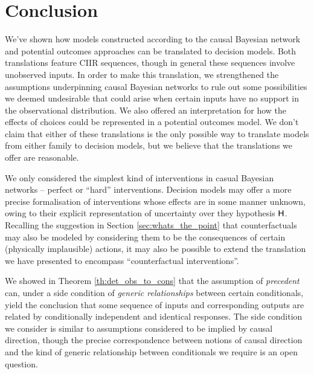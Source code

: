

\section{Conclusion}

We've shown how models constructed according to the causal Bayesian network and potential outcomes approaches can be translated to decision models. Both translations feature CIIR sequences, though in general these sequences involve unobserved inputs. In order to make this translation, we strengthened the assumptions underpinning causal Bayesian networks to rule out some possibilities we deemed undesirable that could arise when certain inputs have no support in the observational distribution. We also offered an interpretation for how the effects of choices could be represented in a potential outcomes model. We don't claim that either of these translations is the only possible way to translate models from either family to decision models, but we believe that the translations we offer are reasonable.

We only considered the simplest kind of interventions in casual Bayesian networks -- perfect or ``hard'' interventions. Decision models may offer a more precise formalisation of interventions whose effects are in some manner unknown, owing to their explicit representation of uncertainty over they hypothesis $\mathsf{H}$. Recalling the suggestion in Section \ref{sec:whats_the_point} that counterfactuals may also be modeled by considering them to be the consequences of certain (physically implausible) actions, it may also be possible to extend the translation we have presented to encompass ``counterfactual interventions''.

We showed in Theorem \ref{th:det_obs_to_cons} that the assumption of \emph{precedent} can, under a side condition of \emph{generic relationships} between certain conditionals, yield the conclusion that some sequence of inputs and corresponding outputs are related by conditionally independent and identical responses. The side condition we consider is similar to assumptions considered to be implied by causal direction, though the precise correspondence between notions of causal direction and the kind of generic relationship between conditionals we require is an open question.


